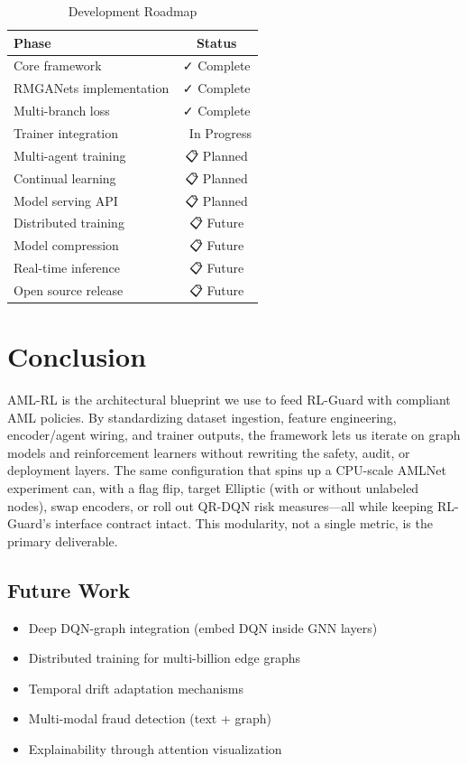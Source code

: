 \documentclass[11pt,a4paper]{article}
\begin{document}
\begin{table}[htbp]
\centering
\caption{Development Roadmap}
\begin{tabular}{@{}lc@{}}
\toprule
\textbf{Phase} & \textbf{Status} \\
\midrule
Core framework & ✓ Complete \\
RMGANets implementation & ✓ Complete \\
Multi-branch loss & ✓ Complete \\
\midrule
Trainer integration & 🔄 In Progress \\
Multi-agent training & 📋 Planned \\
Continual learning & 📋 Planned \\
Model serving API & 📋 Planned \\
\midrule
Distributed training & 📋 Future \\
Model compression & 📋 Future \\
Real-time inference & 📋 Future \\
Open source release & 📋 Future \\
\bottomrule
\end{tabular}
\end{table}

\section{Conclusion}

AML-RL is the architectural blueprint we use to feed RL-Guard with compliant AML policies. By standardizing dataset ingestion, feature engineering, encoder/agent wiring, and trainer outputs, the framework lets us iterate on graph models and reinforcement learners without rewriting the safety, audit, or deployment layers. The same configuration that spins up a CPU-scale AMLNet experiment can, with a flag flip, target Elliptic (with or without unlabeled nodes), swap encoders, or roll out QR-DQN risk measures---all while keeping RL-Guard's interface contract intact. This modularity, not a single metric, is the primary deliverable.

\subsection{Future Work}

\begin{itemize}
    \item Deep DQN-graph integration (embed DQN inside GNN layers)
    \item Distributed training for multi-billion edge graphs
    \item Temporal drift adaptation mechanisms
    \item Multi-modal fraud detection (text + graph)
    \item Explainability through attention visualization
\end{itemize}
\end{document}
